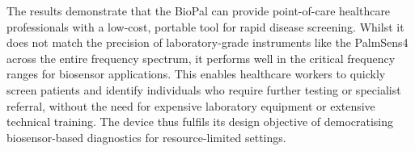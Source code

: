 The results demonstrate that the BioPal can provide point-of-care healthcare professionals with a low-cost, portable tool for rapid disease screening. Whilst it does not match the precision of laboratory-grade instruments like the PalmSens4 across the entire frequency spectrum, it performs well in the critical frequency ranges for biosensor applications. This enables healthcare workers to quickly screen patients and identify individuals who require further testing or specialist referral, without the need for expensive laboratory equipment or extensive technical training. The device thus fulfils its design objective of democratising biosensor-based diagnostics for resource-limited settings.


\label{chap:testing_and_validation}
